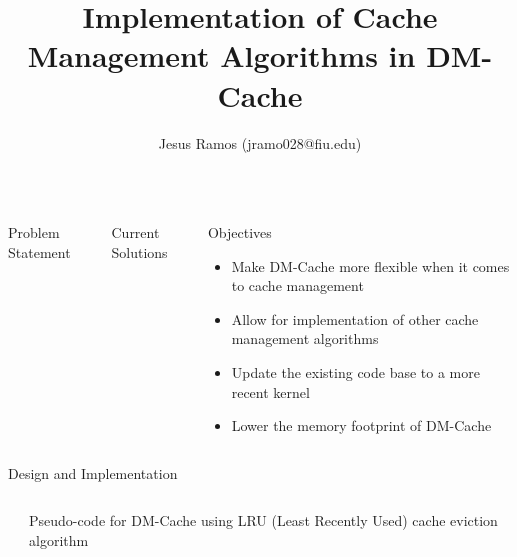 \documentclass[final,12pt]{beamer}
\title{Implementation of Cache Management Algorithms in DM-Cache}
\author{Jesus Ramos (jramo028@fiu.edu)}
\institute[FIU]{Florida International University}
\date{}
\begin{document}
\begin{frame}{}

  \begin{columns}

    \begin{column}{.33\linewidth}
      \begin{block}{\large Problem Statement}
      \end{block}
    \end{column}

    \begin{column}{.33\linewidth}
      \begin{block}{\large Current Solutions}
      \end{block}
    \end{column}

    \begin{column}{.33\linewidth}
      \begin{block}{\large Objectives}

        \begin{itemize}
          \item Make DM-Cache more flexible when it comes to cache management
          \item Allow for implementation of other cache management algorithms
          \item Update the existing code base to a more recent kernel
          \item Lower the memory footprint of DM-Cache
        \end{itemize}

      \end{block}
    \end{column}

  \end{columns}

  \begin{block}{\large Design and Implementation}

    \begin{columns}

      \begin{column}{.01\textwidth}
      \end{column}

      \begin{column}{.33\textwidth}
        

        \centering \small Pseudo-code for DM-Cache using LRU (Least Recently
        Used) cache eviction algorithm
      \end{column}


\end{columns}
\end{block}
\end{frame}
\end{document}
